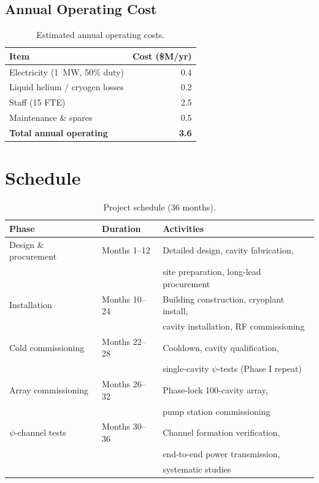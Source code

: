 \documentclass[11pt,letterpaper]{article}
\begin{document}
\subsection{Annual Operating Cost}

\begin{table}[H]
\caption{Estimated annual operating costs.}
\begin{tabular}{lr}
\toprule
Item & Cost (\$M/yr) \\
\midrule
Electricity (1~MW, 50\% duty) & 0.4 \\
Liquid helium / cryogen losses & 0.2 \\
Staff (15 FTE) & 2.5 \\
Maintenance \& spares & 0.5 \\
\midrule
\textbf{Total annual operating} & \textbf{3.6} \\
\bottomrule
\end{tabular}
\end{table}

\section{Schedule}

\begin{table}[H]
\caption{Project schedule (36 months).}
\begin{tabular}{lll}
\toprule
Phase & Duration & Activities \\
\midrule
Design \& procurement & Months 1--12 &
  Detailed design, cavity fabrication, \\
  & & site preparation, long-lead procurement \\
\midrule
Installation & Months 10--24 &
  Building construction, cryoplant install, \\
  & & cavity installation, RF commissioning \\
\midrule
Cold commissioning & Months 22--28 &
  Cooldown, cavity qualification, \\
  & & single-cavity $\psi$-tests (Phase I repeat) \\
\midrule
Array commissioning & Months 26--32 &
  Phase-lock 100-cavity array, \\
  & & pump station commissioning \\
\midrule
$\psi$-channel tests & Months 30--36 &
  Channel formation verification, \\
  & & end-to-end power transmission, \\
  & & systematic studies \\
\bottomrule
\end{tabular}
\end{table}
\end{document}
